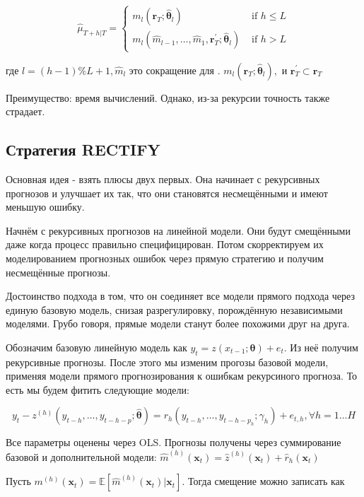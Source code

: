 \documentclass[a4paper,12pt]{article}
\begin{document}
\[
\hat{\mu}_{T+h | T}=\left\{\begin{array}{ll}{m_{l}\left(\boldsymbol{r}_{T} ; \hat{\boldsymbol{\theta}}_{l}\right)} & {\text { if } h \leq L} \\ {m_{l}\left(\hat{m}_{l-1}, \ldots, \hat{m}_{1}, \boldsymbol{r}_{T}^{\prime} ; \hat{\boldsymbol{\theta}}_{l}\right)} & {\text { if } h>L}\end{array}\right.
\]

где $l=\left(h-1 \right) \% L+1, \hat{m}_{l} \text { это сокращение для }.$
$m_{l}\left(\boldsymbol{r}_{T} ; \hat{\boldsymbol{\theta}}_{l}\right),$ и $\boldsymbol{r}_{T}^{\prime} \subset \boldsymbol{r}_{T}$

Преимущество: время вычислений. Однако, из-за рекурсии точность также страдает.
\subsection{Стратегия RECTIFY}

Основная идея - взять плюсы двух первых. Она начинает с рекурсивных прогнозов и улучшает их так, что они становятся несмещёнными и имеют меньшую ошибку.

Начнём с рекурсивных прогнозов на линейной модели. Они будут смещёнными даже когда процесс правильно специфицирован. Потом скорректируем их моделированием прогнозных ошибок через прямую стратегию и получим несмещённые прогнозы.

Достоинство подхода в том, что он соединяет все модели прямого подхода через единую базовую модель, снизая разрегулировку, порождённую независимыми моделями. Грубо говоря, прямые модели станут более похожими друг на друга.

Обозначим базовую линейную модель как $ y_{t}=z\left(x_{t-1} ; \boldsymbol{\theta}\right)+e_{t} $. Из неё получим рекурсивные прогнозы. После этого мы изменим прогозы базовой модели, применяя модели прямого прогнозирования к ошибкам рекурсиного прогноза. То есть мы будем фитить следующие модели:

\[ y_{t}-z^{(h)}\left(y_{t-h}, \ldots, y_{t-h-p} ; \hat{\boldsymbol{\theta}}\right)=r_{h}\left(y_{t-h}, \ldots, y_{t-h-p_{h}} ; \gamma_{h}\right)+e_{t, h},  	 \forall h = 1 \ldots H \]

Все параметры оценены через OLS. Прогнозы получены через суммирование базовой и дополнительной модели: $ \hat{m}^{(h)}\left(\boldsymbol{x}_{t}\right)=\hat{z}^{(h)}\left(\boldsymbol{x}_{t}\right)+\hat{r}_{h}\left(\boldsymbol{x}_{t}\right) $ 

Пусть $ m^{(h)}\left(\boldsymbol{x}_{t}\right)=\mathbb{E}\left[\hat{m}^{(h)}\left(\boldsymbol{x}_{t}\right) | \boldsymbol{x}_{t}\right] $. Тогда смещение можно записать как 
\end{document}
